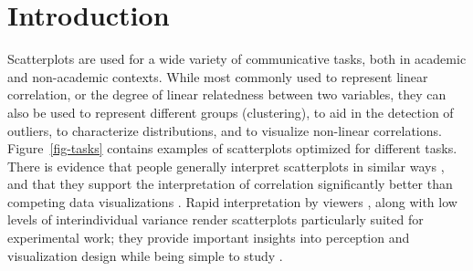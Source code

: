 \documentclass[manuscript, review, anonymous, screen]{acmart}
\begin{document}


\maketitle

\setlength{\parskip}{-0.1pt}

\hypertarget{introduction}{%
\section{Introduction}\label{introduction}}

Scatterplots are used for a wide variety of communicative tasks, both in
academic and non-academic contexts. While most commonly used to
represent linear correlation, or the degree of linear relatedness
between two variables, they can also be used to represent different
groups (clustering), to aid in the detection of outliers, to
characterize distributions, and to visualize non-linear correlations.
Figure~\ref{fig-tasks} contains examples of scatterplots optimized for
different tasks. There is evidence that people generally interpret
scatterplots in similar ways \citep{kay_2015}, and that they support the
interpretation of correlation significantly better than competing data
visualizations \citep{li_2010}. Rapid interpretation by viewers
\citep{rensink_2014}, along with low levels of interindividual variance
render scatterplots particularly suited for experimental work; they
provide important insights into perception and visualization design
while being simple to study \citep{rensink_2014}.
\end{document}
